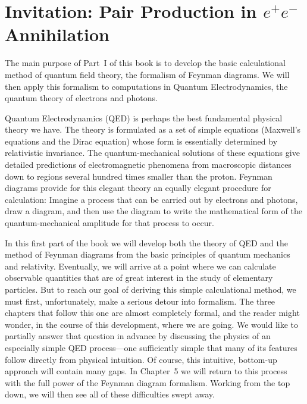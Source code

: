 \chapter{Invitation: Pair Production in $e^{+}e^{-}$ Annihilation}

The main purpose of Part~I of this book is to develop the basic
calculational method of quantum field theory, the formalism of Feynman
diagrams.  We will then apply this formalism to computations in Quantum
Electrodynamics, the quantum theory of electrons and photons.

Quantum Electrodynamics (QED) is perhaps the best fundamental physical
theory we have.  The theory is formulated as a set of simple equations
(Maxwell's equations and the Dirac equation) whose form is essentially
determined by relativistic invariance.  The quantum-mechanical solutions
of these equations give detailed predictions of electromagnetic phenomena
from macroscopic distances down to regions several hundred times smaller
than the proton.  Feynman diagrams provide for this elegant theory an
equally elegant procedure for calculation:  Imagine a process that can be
carried out by electrons and photons, draw a diagram, and then use the
diagram to write the mathematical form of the quantum-mechanical
amplitude for that process to occur.

In this first part of the book we will develop both the theory of QED and
the method of Feynman diagrams from the basic principles of quantum
mechanics and relativity.  Eventually, we will arrive at a point where we
can calculate observable quantities that are of great interest in the
study of elementary particles.  But to reach our goal of deriving this
simple calculational method, we must first, unfortunately, make a serious
detour into formalism.  The three chapters that follow this one are
almost completely formal, and the reader might wonder, in the course of
this development, where we are going.  We would like to partially answer
that question in advance by discussing the physics of an especially
simple QED process---one sufficiently simple that many of its features
follow directly from physical intuition.  Of course, this intuitive,
bottom-up approach will contain many gaps.  In Chapter~5 we will return
to this process with the full power of the Feynman diagram formalism.
Working from the top down, we will then see all of these difficulties
swept away.

